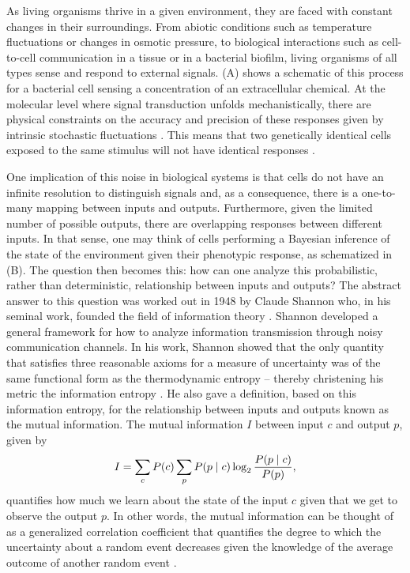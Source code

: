 As living organisms thrive in a given environment, they are faced with
constant changes in their surroundings. From abiotic conditions such as
temperature fluctuations or changes in osmotic pressure, to biological
interactions such as cell-to-cell communication in a tissue or in a bacterial
biofilm, living organisms of all types sense and respond to external signals.
(A) shows a schematic of this process for a bacterial cell
sensing a concentration of an extracellular chemical. At the molecular level
where signal transduction unfolds mechanistically, there are physical
constraints on the accuracy and precision of these responses given by intrinsic
stochastic fluctuations \cite{Nemenman2010}. This means that two genetically
identical cells exposed to the same stimulus will not have identical responses
\cite{Eldar2010}.

One implication of this noise in biological systems is that cells do not have
an infinite resolution to distinguish signals and, as a consequence, there is a
one-to-many mapping between inputs and outputs. Furthermore, given the limited
number of possible outputs, there are overlapping responses between different
inputs. In that sense, one may think of cells performing a Bayesian inference
of the state of the environment given their phenotypic response, as schematized
in (B). The question then becomes this: how can one analyze
this probabilistic, rather than deterministic, relationship between inputs and
outputs? The abstract answer to this question was worked out in 1948 by Claude
Shannon who, in his seminal work, founded the field of information theory
\cite{Shannon1948}. Shannon developed a general framework for how to analyze
information transmission through noisy communication channels. In his work,
Shannon showed that the only quantity that satisfies three reasonable axioms
for a measure of uncertainty was of the same functional form as the
thermodynamic entropy -- thereby christening his metric the information entropy
\cite{MacKay2003}. He also gave a definition, based on this information
entropy, for the relationship between inputs and outputs known as the mutual
information. The mutual information $I$ between input $c$ and output $p$, given
by
\begin{equation}
  I = \sum_c P(c) \sum_p P(p \mid c) \log_2 {P(p \mid c) \over P(p)},
	\label{eq_mutual_info}
\end{equation}
quantifies how much we learn about the state of the input $c$ given that we get
to observe the output $p$. In other words, the mutual information can be
thought of as a generalized correlation coefficient that quantifies the degree
to which the uncertainty about a random event decreases given the knowledge of
the average outcome of another random event \cite{Kinney2010}.


